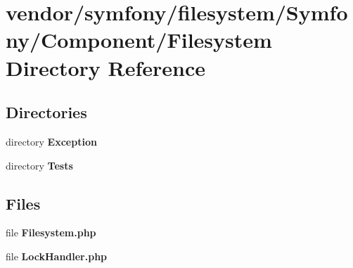 \section{vendor/symfony/filesystem/\+Symfony/\+Component/\+Filesystem Directory Reference}
\label{dir_2020f1ac0fbfc26cd7be049cc5bb3421}
\subsection*{Directories}
\begin{DoxyCompactItemize}
\item 
directory {\bf Exception}
\item 
directory {\bf Tests}
\end{DoxyCompactItemize}
\subsection*{Files}
\begin{DoxyCompactItemize}
\item 
file {\bf Filesystem.\+php}
\item 
file {\bf Lock\+Handler.\+php}
\end{DoxyCompactItemize}
